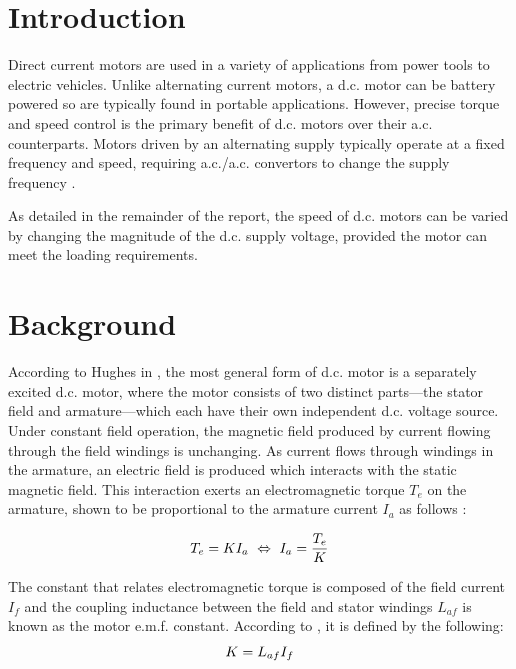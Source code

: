 \documentclass[a4paper,11pt,twocolumn]{article}
\newcommand{\AC}{a.c.\xspace}
\newcommand{\DC}{d.c.\xspace}
\newcommand{\EMF}{e.m.f.\xspace}
\begin{document}
\section{Introduction}

Direct current motors are used in a variety of applications from power tools to 
electric vehicles. Unlike alternating current motors, a \DC motor can be 
battery powered so are typically found in portable applications. However, 
precise torque and speed control is the primary benefit of \DC motors over 
their \AC counterparts. Motors driven by an alternating supply typically 
operate at a fixed frequency and speed, requiring \AC/\AC convertors to change 
the supply frequency \cite[p. 787]{hughes2010hughes}.

As detailed in the remainder of the report, the speed of \DC motors can be 
varied by changing the magnitude of the \DC supply voltage, provided the motor 
can meet the loading requirements.

\section{Background} \label{sec:Background}

According to Hughes in \cite[p.~870]{hughes2010hughes}, the most general form 
of \DC motor is a separately excited \DC motor, where the motor consists of two 
distinct parts---the stator field and armature---which each have their own 
independent \DC voltage source. Under constant field operation, the magnetic 
field produced by current flowing through the field windings is unchanging. As 
current flows through windings in the armature, an electric field is produced 
which interacts with the static magnetic field. This interaction exerts an 
electromagnetic torque $T_e$ on the armature, shown to be proportional to the 
armature current $I_a$ as follows \cite[p.~873]{hughes2010hughes}:

\begin{equation}  \label{eq:T}
    T_e = K I_a ~\Leftrightarrow~ I_a = \frac{T_e}{K} \\
\end{equation}

The constant that relates electromagnetic torque is composed of the field 
current $I_f$ and the coupling inductance between the field and stator windings 
$L_{af}$ is known as the motor \EMF constant. According to 
\cite{brigham2016coursework}, it is defined by the following:
\begin{equation} \label{eq:K}
    K = L_{af} I_f \\
\end{equation}
\end{document}

